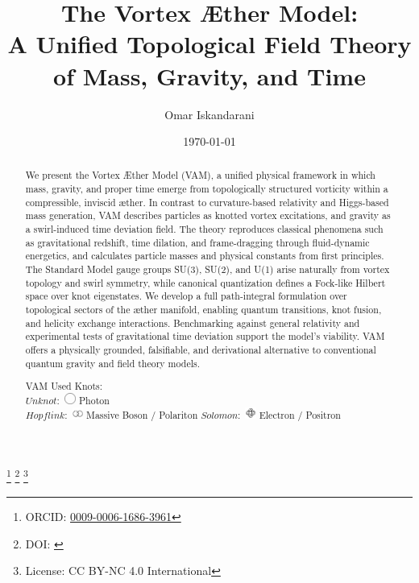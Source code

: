 \documentclass[preprint]{revtex4-2}
\begin{document}
\title{The Vortex Æther Model: \\[1ex]
        \large A Unified Topological Field Theory of Mass, Gravity, and Time}

\author{Omar Iskandarani}
\thanks{ORCID: \href{https://orcid.org/0009-0006-1686-3961}{0009-0006-1686-3961}}
\thanks{DOI: \href{https://doi.org/\paperdoi}{\paperdoi}}
\thanks{License: CC BY-NC 4.0 International}

\date{\today}

\begin{abstract}
            We present the Vortex Æther Model (VAM), a unified physical framework in which mass, gravity, and proper time emerge from topologically structured vorticity within a compressible, inviscid æther. In contrast to curvature-based relativity and Higgs-based mass generation, VAM describes particles as knotted vortex excitations, and gravity as a swirl-induced time deviation field. The theory reproduces classical phenomena such as gravitational redshift, time dilation, and frame-dragging through fluid-dynamic energetics, and calculates particle masses and physical constants from first principles. The Standard Model gauge groups SU(3), SU(2), and U(1) arise naturally from vortex topology and swirl symmetry, while canonical quantization defines a Fock-like Hilbert space over knot eigenstates. We develop a full path-integral formulation over topological sectors of the æther manifold, enabling quantum transitions, knot fusion, and helicity exchange interactions. Benchmarking against general relativity and experimental tests of gravitational time deviation support the model’s viability. VAM offers a physically grounded, falsifiable, and derivational alternative to conventional quantum gravity and field theory models.\\
            \begin{center}
            VAM Used Knots:\\
            \( Unknot \):~\includegraphics[height=1.2em]{images/0_1} Photon \\
            \( Hopf link \):~\includegraphics[height=1.2em]{images/hopf} Massive Boson / Polariton \( Solomon \):~\includegraphics[height=1.2em]{images/solomon} Electron / Positron\\

\end{center}
\end{abstract}
\end{document}
